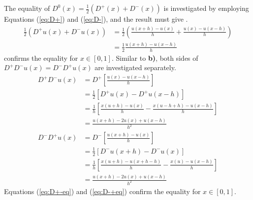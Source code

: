 The equality of $D^0(x) = \frac{1}{2}\left(D^+(x) + D^-(x)\right)$ is investigated by employing Equations (\ref{eq:D+}) and (\ref{eq:D-}), and the result must give .
\begin{align}
	\nonumber
	\frac{1}{2}(D^+u(x) + D^-u(x)) &= \frac{1}{2}\left(\frac{u(x+h) - u(x)}{h} + \frac{u(x) - u(x-h)}{h} \right)\\
								   \label{eq:D0eq}
								   &= \frac{1}{2}\frac{u(x+h) - u(x-h)}{h}
\end{align}
 confirms the equality for $x\in[0,1]$.
Similar to \textbf{b)}, both sides of $D^+D^-u(x) = D^-D^+u(x)$ are investigated separately.
\begin{align}
	\nonumber
	D^+D^-u(x) &= D^+  		  \left[ \frac{u(x) - u(x-h)}{h} \right] \\
	\nonumber
			   &= \frac{1}{2} \left[ D^+ u(x) - D^+ u(x-h) \right] \\
	\nonumber
			   &= \frac{1}{h} \left[ \frac{x(u + h) - u(x)}{h} - \frac{x(u - h + h) - u(x - h)}{h}\right] \\
			   \label{eq:D+-eq}
			   &= \frac{u(x+h) -2u(x)  + u(x-h)}{h^2}
\end{align}
\begin{align}
	\nonumber
	D^-D^+u(x) &= D^-  		  \left[ \frac{u(x+h) - u(x)}{h} \right] \\
	\nonumber
			   &= \frac{1}{2} \left[ D^- u(x+h) - D^- u(x) \right] \\
	\nonumber
			   &= \frac{1}{h} \left[ \frac{x(u + h) - u(x+h-h)}{h} - \frac{x(u) - u(x - h)}{h}\right] \\
			   \label{eq:D-+eq}
			   &= \frac{u(x+h) -2u(x)  + u(x-h)}{h^2}
\end{align}
Equations (\ref{eq:D+-eq}) and (\ref{eq:D-+eq}) confirm the equality for $x\in[0,1]$.

